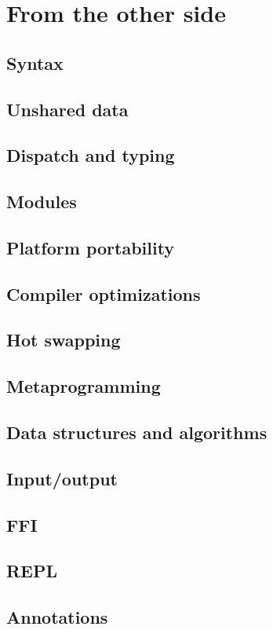 \documentclass[draft]{memoir}
\begin{document}
\part{From the other side}




\chapter{Syntax}
\chapter{Unshared data}
\chapter{Dispatch and typing}
\chapter{Modules}
\chapter{Platform portability}
\chapter{Compiler optimizations}
\chapter{Hot swapping}
\chapter{Metaprogramming}
\chapter{Data structures and algorithms}
\chapter{Input/output}
\chapter{FFI}
\chapter{REPL}
\chapter{Annotations}
%
%
\end{document}

